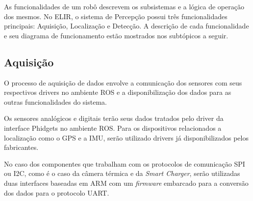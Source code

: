 %
%


As funcionalidades de um robô descrevem os subsistemas e a lógica de operação dos mesmos. No ELIR, o sistema de Percepção possui três funcionalidades principais: Aquisição, Localização e Detecção. A descrição de cada funcionalidade e seu diagrama de funcionamento estão mostrados nos subtópicos a seguir. 

\subsection{Aquisição}
\label{ssec:func1}

O processo de aquisição de dados envolve a comunicação dos sensores com seus respectivos drivers no ambiente ROS e a disponibilização dos dados para as outras funcionalidades do sistema.

 Os sensores analógicos e digitais terão seus dados tratados pelo driver da interface Phidgets no ambiente ROS. Para os dispositivos relacionados a localização como o GPS e a IMU, serão utilizado drivers já disponibilizados pelos fabricantes.

No caso dos componentes que trabalham com os protocolos de comunicação SPI ou I2C, como é o caso da câmera térmica e da \textit{Smart Charger}, serão utilizadas duas interfaces baseadas em ARM com um \textit{firmware} embarcado para a conversão dos dados para o protocolo UART.

